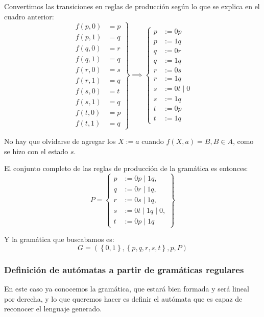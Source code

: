 \documentclass[12pt]{article}
\begin{document}
Convertimos las transiciones en reglas de producción según lo que se explica en el cuadro anterior:
\[
\left.
\begin{aligned}
  f(p,0) &= p\\
  f(p,1) &= q\\
  f(q,0) &= r\\
  f(q,1) &= q\\
  f(r,0) &= s\\
  f(r,1) &= q\\
  f(s,0) &= t\\
  f(s,1) &= q\\
  f(t,0) &= p\\
  f(t,1) &= q
\end{aligned}
\right\} \implies 
\left\{
\begin{aligned}
  p &:= 0p\\
  p &:= 1q\\
  q &:= 0r\\
  q &:= 1q\\
  r &:= 0s\\
  r &:= 1q\\
  s &:= 0t \mid 0\\
  s &:= 1q\\
  t &:= 0p\\
  t &:= 1q
\end{aligned}
\right.
\]

No hay que olvidarse de agregar los $ X:=a $ cuando $ f(X,a)=B,B \in A $, como se hizo con el estado $ s $.

El conjunto completo de las reglas de producción de la gramática es entonces:
\[
P = 
\left\{
\begin{aligned}
	p &:= 0p \mid 1q,\\
	q &:= 0r \mid 1q,\\
	r &:= 0s \mid 1q,\\
	s &:= 0t \mid 1q \mid 0,\\
	t &:= 0p \mid 1q
\end{aligned}
\right\}
\]

Y la gramática que buscabamos es:
\[
G=\left(\left\{0,1\right\},\left\{p,q,r,s,t\right\},p,P\right)
\]

\subsubsection{Definición de autómatas a partir de gramáticas regulares}
En este caso ya conocemos la gramática, que estará bien formada y será lineal por derecha, y lo que queremos hacer es definir el autómata que es capaz de reconocer el lenguaje generado.
\end{document}
